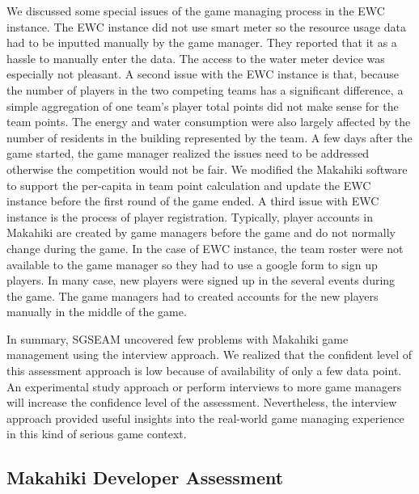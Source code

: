 We discussed some special issues of the game managing process in the EWC instance. The EWC instance did not use smart meter so the resource usage data had to be inputted manually by the game manager. They reported that it as a hassle to manually enter the data. The access to the water meter device was especially not pleasant.  A second issue with the EWC instance is that, because the number of players in the two competing teams has a significant difference, a simple aggregation of one team's player total points did not make sense for the team points. The energy and water consumption were also largely affected by the number of residents in the building represented by the team. A few days after the game started, the game manager realized the issues need to be addressed otherwise the competition would not be fair. We modified the Makahiki software to support the per-capita in team point calculation and update the EWC instance before the first round of the game ended. A third issue with EWC instance is the process of player registration. Typically, player accounts in Makahiki are created by game managers before the game and do not normally change during the game. In the case of EWC instance, the team roster were not available to the game manager so they had to use a google form to sign up players. In many case, new players were signed up in the several events during the game. The game managers had to created accounts for the new players manually in the middle of the game.

In summary, SGSEAM uncovered few problems with Makahiki game management using the interview
approach. We realized that the confident level of this assessment approach is low because of
 availability of only a few data point. An experimental study approach or perform interviews to
more game managers will increase the confidence level of the assessment. Nevertheless, the interview approach provided useful insights into the real-world game managing experience in this kind of serious game context.

\subsection{Makahiki Developer Assessment}

